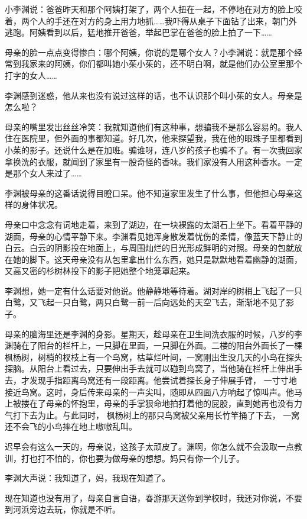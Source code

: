 \documentclass[UTF8]{ctexart}
\begin{document}
小李渊说：爸爸昨天和那个阿姨打架了，两个人扭在一起，不停地在对方的脸上咬着，两个人的手还在对方的身上用力地抓\ldots\ldots 我吓得从桌子下面钻了出来，朝门外逃跑。阿姨看到以后，猛地推开爸爸，举起巴掌在爸爸的脸上拍了一下\ldots\ldots{}

母亲的脸一点点变得惨白：哪个阿姨，你说的是哪个女人？小李渊说：就是那个经常到我家来的阿姨，你们都叫她小茱小茱的，还不明白啊，就是他们办公室里那个打字的女人\ldots\ldots{}

李渊感到迷惑，他从来也没有说过这样的话，也不认识那个叫小茱的女人。母亲是怎么啦？

母亲的嘴里发出丝丝冷笑：我就知道他们有这种事，想骗我不是那么容易的。我人住在医院里，但外面的事都知道。好几次，他来探望我，我在他的眼珠子里都看到小茱的影子。还说什么是在加班。骗谁呀，连八岁的孩子也骗不了。有一次我回家拿换洗的衣服，就闻到了家里有一股奇怪的香味。我们家没有人用这种香水。一定是那个女人来过了\ldots\ldots{}

李渊被母亲的这番话说得目瞪口呆。他不知道家里发生了什么事，但他担心母亲这样的身体状况。

母亲口中念念有词地走着，来到了湖边，在一块裸露的太湖石上坐下。看着平静的湖面，母亲的心情平静下来。李渊看见她浑身散发着忧伤的柔情，像蓝天下静止的白云。白云的阴影投在地面上，与周围灿烂的日光形成鲜明的对照。母亲的包就放在她的脚下。这天母亲没有从包里拿出什么东西，她只是默默地看着幽静的湖面，又高又密的杉树林投下的影子把她整个地笼罩起来。

李渊想，她一定有什么话要对他说。他静静地等待着。湖对岸的树梢上飞起了一只白鹭，又飞起一只白鹭，两只白鹭一前一后向远处的天空飞去，渐渐地不见了影子。

母亲的脑海里还是李渊的身影。星期天，趁母亲在卫生间洗衣服的时候，八岁的李渊骑在了阳台的栏杆上，一只脚在里面，一只脚在外面。二楼的阳台外面长了一棵枫杨树，树梢的杈枝上有一个鸟窝，枯草烂叶间，一窝刚出生没几天的小鸟在探头探脑。从阳台上看过去，只要伸出手去就可以碰到鸟窝了，当他骑在栏杆上伸出手去，才发现手指距离鸟窝还有一段距离。他尝试着探长身子伸展手臂，
一寸寸地接近鸟窝。这时，身后传来母亲的一声尖叫，随即从四面八方响起了惊叫声。他马上被搂在了母亲的怀抱里，母亲的手掌狠命地拍打着他的屁股，直到她再也没有力气打下去为止。与此同时，
枫杨树上的那只鸟窝被父亲用长竹竿捅了下去，
一窝还不会飞的小鸟摔在地上嗷嗷乱叫。

迟早会有这么一天的，母亲说，这孩子太顽皮了。渊啊，你怎么就不会汲取一点教训，打也打不怕的，你也要为做母亲的想想。妈只有你一个儿子。

李渊大声说：我知道了，妈，我现在知道了。

现在知道也没有用了，母亲自言自语，春游那天送你到学校时，我还对你说，不要到河浜旁边去玩，你就是不听。
\end{document}
